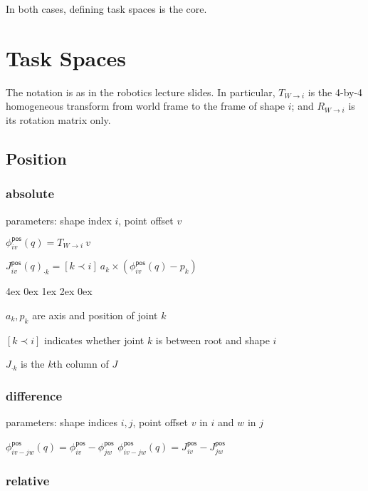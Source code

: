 \documentclass[10pt,fleqn,twoside]{article}
\newenvironment{items}{
\par\small
\begin{list}{--}{\leftmargin4ex \rightmargin0ex \labelsep1ex \labelwidth2ex
\topsep0pt \parsep0ex \itemsep3pt}
}{
\end{list}
}
\newcommand{\pos}{{\textsf{pos}}}
\newcommand{\TR}[2]{T_{{#1}\rightarrow{#2}}}
\newcommand{\RO}[2]{R_{{#1}\rightarrow{#2}}}
\begin{document}
In both cases, defining task spaces is the core.

\section{Task Spaces}

The notation is as in the robotics lecture slides. In particular,
$\TR{W}{i}$ is the 4-by-4 homogeneous transform from world frame to
the frame of shape $i$; and $\RO{W}{i}$ is its rotation matrix only.





\subsection{Position}

\subsubsection{absolute}

parameters: shape index $i$, point offset $v$

$\phi^\pos_{iv}(q) = \TR{W}{i}~ v$

$J^\pos_{iv}(q)_{\cdot k} = [k\prec i]~ a_k \times(\phi^\pos_{iv}(q) - p_k)$

\begin{items}
\item $a_k,p_k$ are axis and position of joint $k$
\item $[k\prec i]$ indicates whether joint $k$ is between root and
shape $i$
\item $J_{\cdot k}$ is the $k$th column of $J$
\end{items}

\subsubsection{difference}

parameters: shape indices $i,j$, point offset $v$ in $i$ and $w$ in $j$

$\phi^\pos_{iv-jw}(q) = \phi^\pos_{iv} - \phi^\pos_{jw}$
$\phi^\pos_{iv-jw}(q) = J^\pos_{iv} - J^\pos_{jw}$

\subsubsection{relative}
\end{document}

